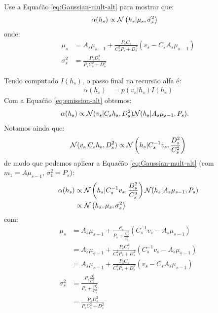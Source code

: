 \begin{exenumerate}
\begin{solution}
    \end{solution}
    
    \item Use a Equa\'c\~ao \eqref{eq:Gaussian-mult-alt} para mostrar que:
    \begin{align}
        \alpha(h_s) & \propto \mathcal{N}\left(h_s | \mu_s , \sigma_s^2\right)
    \end{align}
    onde:
    \begin{align}
        \mu_s & =  A_s \mu_{s-1} + \frac{P_sC_s}{C_s^2 P_s+ D_s^2}\left(v_s - C_s A_s \mu_{s-1}\right)\\
        \sigma^2_s & =  \frac{P_s D_s^2}{P_s C_s^2+ D_s^2}
    \end{align}
    
    \begin{solution}
        Tendo computado $I(h_s)$, o passo final na recurs\~ao alfa \'e:
        \begin{align}
            \alpha(h_s) & = p(v_s | h_s) I(h_s)
        \end{align}
        Com a Equa\'c\~ao \eqref{eq:emission-alt} obtemos:
        \begin{align}
            \alpha(h_s) & \propto \mathcal{N}(v_s | C_s h_s, D^2_s)  \mathcal{N}(h_s | A_s \mu_{s-1}, P_s).
        \end{align}
        Notamos ainda que:
        \begin{align}
            \mathcal{N}(v_s | C_s h_s, D_s^2) \propto \mathcal{N} \left(h_s | C_s^{-1}
            v_s, \frac{D_s^2}{C_s^2}\right)
        \end{align}
        de modo que podemos aplicar a Equa\'c\~ao \eqref{eq:Gaussian-mult-alt} (com $m_1 = A \mu_{s-1}$, $\sigma_1^2 = P_s$):
        \begin{align}
            \alpha(h_s) & \propto  \mathcal{N}\left(h_s | C_s^{-1} v_s, \frac{D_s^2}{C_s^2}\right) \mathcal{N}(h_s | A_s \mu_{s-1}, P_s)\\
            & \propto \mathcal{N}\left(h_s, \mu_s, \sigma_s^2\right)
        \end{align}
        com:
        \begin{align}
            \mu_s & =  A_s \mu_{s-1} + \frac{P_s}{P_s + \frac{D_s^2}{C_s^2}}\left(C_s^{-1} v_s - A_s \mu_{s-1}\right)\\
            & =  A_s \mu_{s-1} + \frac{P_sC_s^2}{C_s^2 P_s+ D_s^2}\left(C_s^{-1}v_s - A_s \mu_{s-1}\right)\\
            & =  A_s \mu_{s-1} + \frac{P_sC_s}{C_s^2 P_s+ D_s^2}\left(v_s - C_s A_s \mu_{s-1}\right)\\
            \sigma^2_s & = \frac{P_s \frac{D_s^2}{C_s^2}}{P_s + \frac{D_s^2}{C_s^2}}\\
            & =  \frac{P_s D_s^2}{P_s C_s^2+ D_s^2}\\
        \end{align}
    \end{solution}
    

\end{exenumerate}
